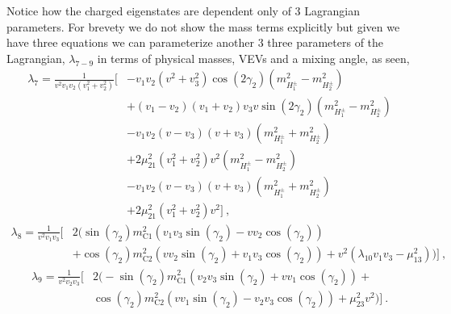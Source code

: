 \documentclass[10pt]{book}
\renewcommand{\(}{\left(}
\renewcommand{\)}{\right)}
\renewcommand{\[}{\left[}
\renewcommand{\]}{\right]}
\begin{document}
Notice how the charged eigenstates are dependent only of 3 Lagrangian parameters. For brevety we do not show the mass terms explicitly but given we have three equations we can parameterize another 3 three parameters of the Lagrangian, $\lambda_{7-9}$ in terms of physical masses, VEVs and a mixing angle, as seen, 
\begin{equation}
\begin{split}
\lambda_7 = \frac{1}{v^2 v_1 v_2
   \left(v_1^2+v_2^2\right)} \Bigg[ & -v_1 v_2 \left(v^2+v_3^2\right) \cos \left(2 \gamma _2\right) \left( m_{H^\pm_1}^2 - m_{H^\pm_2}^2 \right) \\ & + \left(v_1-v_2\right) \left(v_1+v_2\right) v_3 v \sin \left(2 \gamma _2\right)
   \left( m_{H^\pm_1}^2  - m_{H^\pm_2}^2 \right) \\ & -v_1 v_2 \left(v-v_3\right) \left(v+v_3\right) \left( m_{H^\pm_1}^2 + m_{H^\pm_2}^2 \right)  \\ & +2 \mu_{21}^2 \left(v_1^2+v_2^2\right) v^2 
   \left( m_{H^\pm_1}^2 - m_{H^\pm_2}^2 \right)  \\ & -v_1 v_2 \left(v-v_3\right) \left(v+v_3\right)  \left( m_{H^\pm_1}^2 + m_{H^\pm_2}^2 \right) \\ & +2 \mu_{21}^2 \left(v_1^2+v_2^2\right) v^2 \Bigg] \ , 
\end{split}
\end{equation}
%
\begin{equation}
\begin{split}
\lambda_8  = \frac{1}{v^2 v_1 v_3} \Bigg[ & 2 \Bigg(\sin \left(\gamma _2\right) m_{\text{C1}}^2 \left(v_1 v_3 \sin \left(\gamma _2\right)-v v_2 \cos \left(\gamma _2\right)\right) \\ & +\cos \left(\gamma _2\right) m_{\text{C2}}^2 \left(v v_2 \sin\left(\gamma _2\right)+v_1 v_3 \cos \left(\gamma _2\right)\right)+v^2 \left(\lambda _{10} v_1 v_3- \mu_{13}^2\right)\Bigg) \Bigg] \ , 
\end{split}
\end{equation}
%
\begin{equation}
\begin{split}
\lambda_9 = \frac{1}{v^2 v_2 v_3} \Bigg[ & 2 \Bigg(-\sin \left(\gamma _2\right) m_{\text{C1}}^2 \left(v_2 v_3 \sin \left(\gamma _2\right)+v v_1 \cos \left(\gamma _2\right)\right)+ \\ & \cos \left(\gamma _2\right) m_{\text{C2}}^2 \left(v v_1 \sin \left(\gamma _2\right)-v_2 v_3 \cos \left(\gamma _2\right)\right)+\mu_{23}^2 v^2\Bigg) \Bigg] \ .
\end{split}
\end{equation} 
\end{document}
